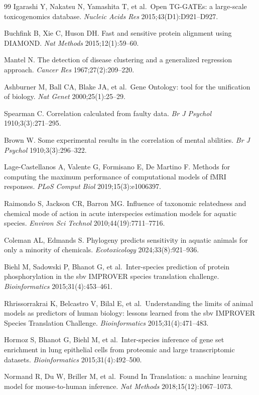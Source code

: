 \documentclass[11pt,a4paper]{article}
\begin{document}
\begin{thebibliography}{99}
Igarashi Y, Nakatsu N, Yamashita T, et al.~Open TG-GATEs: a large-scale toxicogenomics database. \emph{Nucleic Acids Res} 2015;43(D1):D921--D927.

Buchfink B, Xie C, Huson DH. Fast and sensitive protein alignment using DIAMOND. \emph{Nat Methods} 2015;12(1):59--60.

Mantel N. The detection of disease clustering and a generalized regression approach. \emph{Cancer Res} 1967;27(2):209--220.

Ashburner M, Ball CA, Blake JA, et al.~Gene Ontology: tool for the unification of biology. \emph{Nat Genet} 2000;25(1):25--29.

Spearman C. Correlation calculated from faulty data. \emph{Br J Psychol} 1910;3(3):271--295.

Brown W. Some experimental results in the correlation of mental abilities. \emph{Br J Psychol} 1910;3(3):296--322.

Lage-Castellanos A, Valente G, Formisano E, De Martino F. Methods for computing the maximum performance of computational models of fMRI responses. \emph{PLoS Comput Biol} 2019;15(3):e1006397.

Raimondo S, Jackson CR, Barron MG. Influence of taxonomic relatedness and chemical mode of action in acute interspecies estimation models for aquatic species. \emph{Environ Sci Technol} 2010;44(19):7711--7716.

Coleman AL, Edmands S. Phylogeny predicts sensitivity in aquatic animals for only a minority of chemicals. \emph{Ecotoxicology} 2024;33(8):921--936.

Biehl M, Sadowski P, Bhanot G, et al.~Inter-species prediction of protein phosphorylation in the sbv IMPROVER species translation challenge. \emph{Bioinformatics} 2015;31(4):453--461.

Rhrissorrakrai K, Belcastro V, Bilal E, et al.~Understanding the limits of animal models as predictors of human biology: lessons learned from the sbv IMPROVER Species Translation Challenge. \emph{Bioinformatics} 2015;31(4):471--483.

Hormoz S, Bhanot G, Biehl M, et al.~Inter-species inference of gene set enrichment in lung epithelial cells from proteomic and large transcriptomic datasets. \emph{Bioinformatics} 2015;31(4):492--500.

Normand R, Du W, Briller M, et al.~Found In Translation: a machine learning model for mouse-to-human inference. \emph{Nat Methods} 2018;15(12):1067--1073.


\end{thebibliography}
\end{document}
